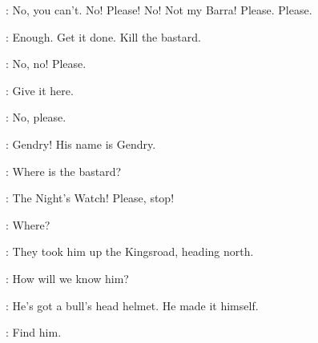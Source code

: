 \MHAEGEN: No, you can't. No! Please! No! Not my Barra! Please. Please.

\JANOSSLYNT: Enough. Get it done. Kill the bastard.


\MHAEGEN: No, no! Please.

\JANOSSLYNT: Give it here.

\MHAEGEN: No, please.


\scene


\TOBHOMOTT: Gendry! His name is Gendry.

\JANOSSLYNT: Where is the bastard?

\TOBHOMOTT: The Night's Watch! Please, stop!

\JANOSSLYNT: Where?

\TOBHOMOTT: They took him up the Kingsroad, heading north.

\JANOSSLYNT: How will we know him?

\TOBHOMOTT: He's got a bull's head helmet. He made it himself.

\JANOSSLYNT:  Find him.



